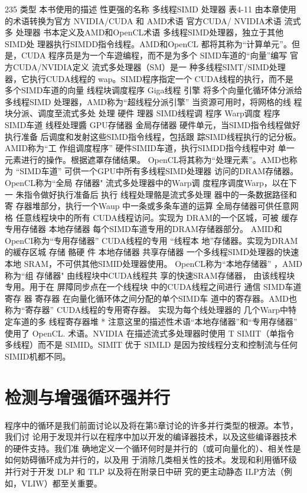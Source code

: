 235
类型
本书使用的描述
性更强的名称
多线程SIMD
处理器
表4-11 由本章使用的术语转换为官方 NVIDIA/CUDA 和 AMD术语
官方CUDA/
NVIDIA术语
流式多
处理器
书本定义及AMD和OpenCL术语
多线程SIMD处理器，独立于其他SIMD处
理器执行SIMDD指令线程。AMD和OpenCL
都将其称为“计算单元”。但是，CUDA
程序员是为一个车遊编程，而不是为多个
SIMD车道的“向量”编写
官方CUDA/NVIDIA定义
流式多处理器（SM）是一
种多线程SIMT/SIMD处理
器，它执行CUDA线程的
wap。SIMD程序指定一个
CUDA线程的执行，而不是
多个SIMD车道的向量
线程块调度程序
Giga线程
引擎
将多个向量化循环体分派给多线程SIMD
处理器，AMD称为“超线程分派引擎”
当资源可用时，将网格的线
程块分派、调度至流式多处
处理
硬件
理器
SIMD线程调
程序
Warp调度
程序
SIMD车道
线秷处理醬
GPU存储器
金局存储器
硬件单元，当SIMD指令线程做好执行准备
后调度和发射这些SIMD指令线程，包括跟
踪SIMD线程执行的记分板。AMID称为“工
作组调度程序”
硬件SIMID车道，执行SIMDD指今线程中对
单一元素进行的操作。根据遮罩存储结果。
OpenCL将其称为“处理元素”。AMD也称
为 “SIMD车道”
可供一个GPU中所有多线程SIMD处理器
访问的DRAM存储器。OpenCL称为“全局
存储器"
流式多处理器中的Warp调
度程序调度Warp，以在下一
朱指令做好执行准备后
执行
线程处理骼是流式多处理
器中的一条数据路径和寄
存器堆部分，执行一个Waup
中一条或多条车道的运算
全局存储器可供任意网格
任意线程块中的所有
CUDA线程访问。实现为
DRAM的一个区城，可被
缓存
专用存储器
本地存储器
每个SIMD车道专用的DRAM存储器部分。
AMID和OpenCI称为“专用存储器”
CUDA线程的专用 “线程本
地”存储器。实现为DRAM
的緩存区城
存储
骼硬
件
本地存储器
共享存储器
一个多线程SIMD处理器的快速本地
SRAM，不可供其他SIMID处理器使用。
OpenCL称为“本地存储器”
，AMD称为“组
存储器"
由线程块中CUDA线程共
享的快速SRAM存储器，
由该线程块专用。用于在
屏障同步点在一个线程块
中的CUDA线程之间进行
通信
SIMD车道寄存
器
寄存器
在向量化循环体之间分配的单个SIMD车
道中的寄存器。AMD也称为“寄存器”
CUDA线程的专用寄存器。
实现为每个线处理器的
几个Warp中特定车道的多
线程寄存器堆
* 注意这里的描述性术语“本地存储器”和“专用存储器” 使用了 OpenCL. 术语。NVIDIA 在描述流式多处理器时使用
T SIMIT（单指令多线程）而不是 SIMID。SIMIT 优于 SIMLD 是因为按线程分支和控制流与任何 SIMID机都不同。

\section{检测与增强循环强并行}
程序中的循环是我们前面讨论以及将在第5章讨论的许多并行类型的根源。本节，我们讨
论用于发现并行以在程序中加以开发的编译器技术，以及这些编译器技术的硬件支持。我们准
确地定义一个循环何时是并行的（或可向量化的）、相关性是如何妨碍循环成为并行的，以及用
于消除几类相关性的技术。发现和利用循环级并行对于开发 DLP 和 TLP 以及将在附录日中研
究的更主动静态 ILP方法（例如，VLIW）都至关重要。

